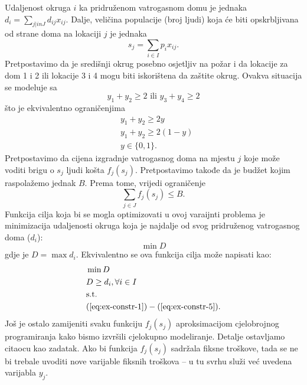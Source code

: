 \documentclass[a4paper, utf8, 11pt, colorlinks]{book}
\begin{document}
Udaljenost okruga $i$ ka pridruženom vatrogasnom domu je jednaka $d_i = \sum_{j |in J} d_{ij}x_{ij} $. Dalje, veličina populacije (broj ljudi) koja će biti opskrbljivana od strane doma na lokaciji $j$ je jednaka 
\begin{equation}\label{eq:ex-constr-3}
    s_j = \sum_{i \in I} p_i x_{ij}. 
\end{equation}
Pretpostavimo da je središnji okrug posebno osjetljiv na požar i da lokacije za dom  1 i 2 ili lokacije 3 i 4 mogu biti iskorištena da zaštite okrug. Ovakva situacija se modeluje sa
\begin{equation*} 
    y_1 + y_2 \geq 2 \mbox{ ili } y_3 + y_4 \geq 2
\end{equation*}
što je ekvivalentno ograničenjima 
\begin{align}
    &y_1 + y_2 \geq 2 y \nonumber \\
    &y_1 + y_2 \geq 2 (1-y) \nonumber \\
    & y \in \{0, 1 \}.\label{eq:ex-constr-4}
\end{align}
Pretpostavimo da cijena izgradnje vatrogasnog doma na mjestu $j$ koje može voditi brigu o $s_j$ ljudi košta $f_j(s_j)$. Pretpostavimo takođe da je budžet kojim raspolažemo jednak $B$. Prema tome, vrijedi ograničenje
\begin{equation}\label{eq:ex-constr-5}
     \sum_{j \in J} f_j(s_j) \leq B.
\end{equation}
 Funkcija cilja koja bi se mogla optimizovati u ovoj varaijnti problema je minimizacija udaljenosti 
 okruga koja je najdalje od svog pridruženog vatrogasnog doma ($d_i$):
      $$\min D $$
 gdje je $D= \max d_i$. Ekvivalentno se ova funkcija cilja može napisati kao:
 \begin{align*}
      &\min D \\
      & D \geq d_i,  \forall i \in I \\
      & \mbox{s.t. } \\ 
      &(\ref{eq:ex-constr-1})-(\ref{eq:ex-constr-5}).
 \end{align*}
 Još je ostalo zamijeniti svaku funkciju $f_j (s_j)$ aproksimacijom cjelobrojnog programiranja kako bismo izvršili cjelokupno modeliranje. Detalje ostavljamo citaocu kao zadatak. Ako bi funkcija $f_j (s_j)$ sadržala fiksne troškove, tada se ne bi trebale uvoditi nove varijable fiksnih troškova -- u tu svrhu služi već uvedena varijabla $y_j$. 
 
\end{document}

